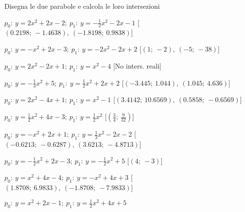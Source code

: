 \begin{esercizio}\label{ese:}
 Disegna le due parabole e calcola le loro intersezioni
 \begin{enumeratea}
  \item  $p_0:~y=2 x^2 +2 x -2;~p_1:~y=-\frac{1}{2} x^2 -2 x -1$
   \hfill [$\left (0.2198;~-1.4638 \right ),~\left (-1.8198;~0.9838 \right )$]
  \item  $p_0:~y=- x^2 +2 x -3;~p_1:~y=-2 x^2 -2 x +2$
   \hfill [$\left (1;~-2 \right ),~\left (-5;~-38 \right )$]
  \item  $p_0:~y=2 x^2 -2 x +1;~p_1:~y=x^2 -4$
   \hfill [No inters. reali]
  \item  $p_0:~y=-\frac{1}{3} x^2 +5;~p_1:~y=\frac{1}{2} x^2 +2 x +2$
   \hfill [$\left (-3.445;~1.044 \right ),~\left (1.045;~4.636 \right )$]
  \item  $p_0:~y=2 x^2 -4 x +1;~p_1:~y=x^2 -1$
   \hfill [$\left (3.4142;~10.6569 \right ),~\left (0.5858;~-0.6569 \right )$]
  \item  $p_0:~y=\frac{1}{2} x^2 +4 x -3;~p_1:~y=\frac{1}{2} x^2 $
   \hfill [$\left (\frac{3}{4};~\frac{9}{32} \right )$]
  \item  $p_0:~y=- x^2 +2 x +1;~p_1:~y=\frac{1}{3} x^2 -2 x -2$
   \hfill [$\left (-0.6213;~-0.6287 \right ),~\left (3.6213;~-4.8713 \right )$]
  \item  $p_0:~y=-\frac{1}{2} x^2 +2 x -3;~p_1:~y=-\frac{1}{2} x^2 +5$
   \hfill [$\left (4;~-3 \right )$]
  \item  $p_0:~y=x^2 +4 x -4;~p_1:~y=- x^2 +4 x +3$
   \hfill [$\left (1.8708;~6.9833 \right ),~\left (-1.8708;~-7.9833 \right )$]
  \item  $p_0:~y=x^2 +2 x -1;~p_1:~y=\frac{1}{2} x^2 +4 x +5$

\end{enumeratea}
\end{esercizio}

